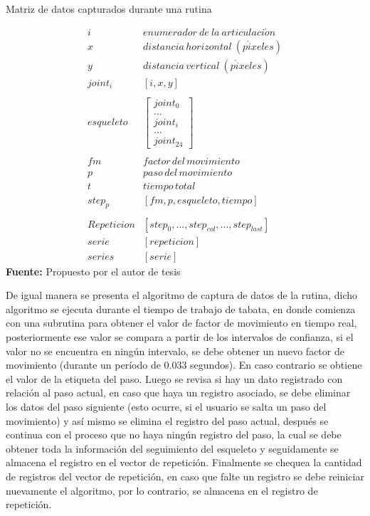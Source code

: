 \begin{formula}[H]
	\centering
	\caption{Matriz de datos capturados durante una rutina}
	\label{frm:MatrizDatosRepeticion}
	\begin{equation}
\begin{matrix}
i & enumerador\: de\: la\: articulaci\acute{o}n \\ 
x & distancia\, horizontal \: (p\acute{i}xeles) \\ 
y & distancia\, vertical\: (p\acute{i}xeles) \\ 
joint_{i}& [i,x,y] \\ 
 & \\ 
esqueleto & \begin{bmatrix}
joint_{0} \\ 
... \\ 
joint_{i}\\ 
... \\ 
joint_{24}
\end{bmatrix}  \\ 
 & \\ 
fm & factor \, del \, movimiento \\ 
p  & paso \, del \,movimiento \\ 
t  & tiempo \, total \\ 
step_{p}  & [fm,p,esqueleto, tiempo] \\
 & \\ 
Repeticion & [step_{0}, ...,  step_{col}, ..., step_{last}] \\
serie & [repeticion] \\
series & [serie]
\end{matrix}
	\end{equation}
	\textbf{Fuente:} Propuesto por el autor de tesis
\end{formula}
De igual manera se presenta el algoritmo de captura de datos de la rutina, dicho algoritmo se ejecuta durante el tiempo de trabajo de tabata, en donde comienza con una subrutina para obtener el valor de factor de movimiento en tiempo real, posteriormente ese valor se compara a partir de los intervalos de confianza, si el valor no se encuentra en ning\'un intervalo, se debe obtener un nuevo factor de movimiento (durante un per\'iodo de 0.033 segundos). En caso contrario se obtiene el valor de la etiqueta del paso. Luego se revisa si hay un dato registrado con relaci\'on al paso actual, en caso que haya un registro asociado, se debe eliminar los datos del paso siguiente (esto ocurre, si el usuario se salta un paso del movimiento) y as\'i mismo se elimina el registro del paso actual, despu\'es se continua con el proceso que no haya ning\'un registro del paso, la cual se debe obtener toda la informaci\'on del seguimiento del esqueleto y seguidamente se almacena el registro en el vector de repetici\'on. Finalmente se chequea la cantidad de registros del  vector de repetici\'on, en caso que falte un registro se debe reiniciar nuevamente el algoritmo, por lo contrario, se almacena en el registro de repetici\'on.
